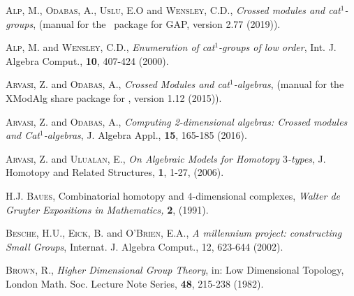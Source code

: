 \documentclass[a4paper,11pt]{article}
\theoremstyle{plain}
\theoremstyle{definition}
\begin{document}
\begin{thebibliography}{99}

	 \textsc{Alp, M.}, \textsc{Odabas, A.}, 
	               \textsc{Uslu, E.O} and \textsc{Wensley, C.D.},   
	\emph{Crossed modules and cat$^{1}$-groups}, 
	{(manual for the \XMod\ package for \textsf{GAP}, version 2.77 (2019))}. 
	
	 \textsc{Alp, M.} and \textsc{Wensley, C.D.}, 
	\emph{Enumeration of cat$^{1}$-groups of low order}, 
	Int. J. Algebra Comput., \textbf{10}, 407-424 (2000).
	
	
	 \textsc{Arvasi, Z.} and \textsc{Odabas, A.},  
	\emph{Crossed Modules and cat$^1$-algebras}, 
	{(manual for the \textsf{XModAlg} share package for \GAP, version 1.12  
	(2015)).} 
	
	 \textsc{Arvasi, Z.} and \textsc{Odabas, A.}, 
	\emph{Computing 2-dimensional algebras: Crossed modules and Cat$^1$-algebras}, 
	J. Algebra Appl., \textbf{15}, 165-185 (2016).
	
	 \textsc{Arvasi, Z.} and \textsc{Ulualan, E.}, 
	\emph{On Algebraic Models for Homotopy $3$-types}, 
	J. Homotopy and Related Structures, \textbf{1}, 1-27, (2006).
		
	
	 \textsc{H.J. Baues}, 
	\textrm{Combinatorial homotopy and $4$-dimensional complexes,} 
	\emph{Walter de Gruyter Expositions in Mathematics,} \textbf{2}, (1991).
	
	
	\textsc{Besche, H.U.}, \textsc{Eick, B.} and \textsc{O'Brien, E.A.}, 
	\emph{A millennium project: constructing Small Groups}, 
	Internat. J. Algebra Comput., 12, 623-644 (2002).
	
	 \textsc{Brown, R.}, 
	\emph{Higher Dimensional Group Theory}, 
	in: Low Dimensional Topology, 
	London Math. Soc. Lecture Note Series, \textbf{48}, 215-238 (1982).
	

\end{thebibliography}
\end{document}
